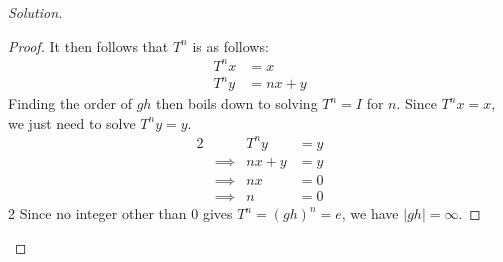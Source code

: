 \documentclass[12pt]{article}
\newenvironment{problem}[2][Problem]{\begin{trivlist}
\item[\hskip \labelsep {\bfseries #1}\hskip \labelsep {\bfseries #2.}]}{\end{trivlist}}
\newenvironment{solution}
  {\renewcommand\qedsymbol{$\blacksquare$}\begin{proof}[Solution]}
{\end{proof}}
\begin{document}
\begin{problem}{1.12}
\begin{solution}
\begin{proof}
      It then follows that $T^n$ is as follows:
      \begin{align*}
        T^nx &= x \\
        T^ny &= nx + y
      \end{align*}
      Finding the order of $gh$ then boils down to solving 
      $T^n=I$ for $n$. Since $T^nx=x$, we just need to solve 
      $T^ny=y$.
      \begin{alignat*}{2}
        & & T^ny &= y \\
        &\implies &nx + y &= y \\
        &\implies &nx &= 0 \\
        &\implies &n &= 0 
      \end{alignat*}{2}
    Since no integer other than 0 gives $T^n=(gh)^n=e$, we have $|gh|=\infty$.
    \end{proof}
  \end{solution}
\end{problem}
\end{document}
